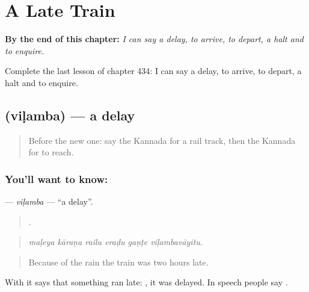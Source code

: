 
\chapter{A Late Train}
\label{ch:ka-a-late-train}

\begin{chapteropening}
\textbf{By the end of this chapter:} \emph{I can say a delay, to arrive, to depart, a halt and to enquire.}

Complete the last lesson of chapter 434: I can say a delay, to arrive, to depart, a halt and to enquire.
\end{chapteropening}

\section[\texorpdfstring{\kn{ವಿಳಂಬ} (viḷamba)}{ವಿಳಂಬ (viḷamba)}]{ (viḷamba) — a delay}

\label{lesson:KA-C434-vilamba}



\begin{quote}
Before the new one: say the Kannada for a rail track, then the Kannada for to reach.
\end{quote}

\subsection*{You'll want to know: }
\textbf{} — \emph{viḷamba} — \textquotedblleft{}a delay\textquotedblright{}.

\begin{quote}
     .
\end{quote}

\begin{quote}
\emph{maḷeya kāraṇa railu eraḍu gaṇṭe viḷambavāyitu.}
\end{quote}

\begin{quote}
Because of the rain the train was two hours late.
\end{quote}

With  it says that something ran late: , it was delayed. In speech people say .

